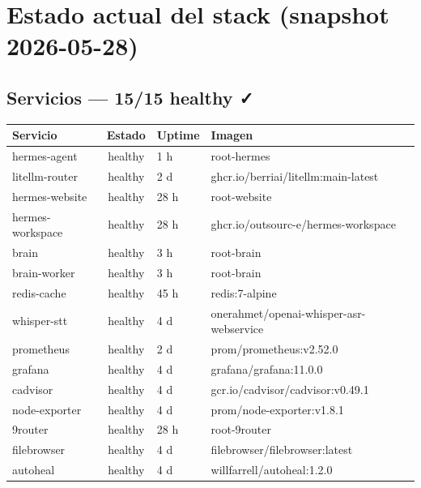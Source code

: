 \documentclass[11pt,a4paper]{article}
\begin{document}
\newpage

\section{Estado actual del stack (snapshot 2026-05-28)}

\subsection{Servicios — 15/15 healthy ✓}

\begin{center}
\begin{longtable}{|l|c|l|l|}
\hline
\rowcolor{hermesblue}\color{white}\textbf{Servicio} & \color{white}\textbf{Estado} & \color{white}\textbf{Uptime} & \color{white}\textbf{Imagen}\\
\hline
\endhead
hermes-agent & healthy & 1 h & root-hermes\\
litellm-router & healthy & 2 d & ghcr.io/berriai/litellm:main-latest\\
hermes-website & healthy & 28 h & root-website\\
hermes-workspace & healthy & 28 h & ghcr.io/outsourc-e/hermes-workspace\\
brain & healthy & 3 h & root-brain\\
brain-worker & healthy & 3 h & root-brain\\
redis-cache & healthy & 45 h & redis:7-alpine\\
whisper-stt & healthy & 4 d & onerahmet/openai-whisper-asr-webservice\\
prometheus & healthy & 2 d & prom/prometheus:v2.52.0\\
grafana & healthy & 4 d & grafana/grafana:11.0.0\\
cadvisor & healthy & 4 d & gcr.io/cadvisor/cadvisor:v0.49.1\\
node-exporter & healthy & 4 d & prom/node-exporter:v1.8.1\\
9router & healthy & 28 h & root-9router\\
filebrowser & healthy & 4 d & filebrowser/filebrowser:latest\\
autoheal & healthy & 4 d & willfarrell/autoheal:1.2.0\\
\hline
\end{longtable}
\end{center}
\end{document}
